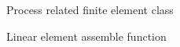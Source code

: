 \begin{figure}[htb!]
\centering
\shadowbox{
\begin{minipage}{\textwidth}

\end{minipage}
}
\caption{Process related finite element class}
\label{fig:fem_one}
\end{figure}


\begin{figure}[H]
\centering
{}
\caption{Linear element assemble function}
\label{fig:fem_asm}
\end{figure}



%



